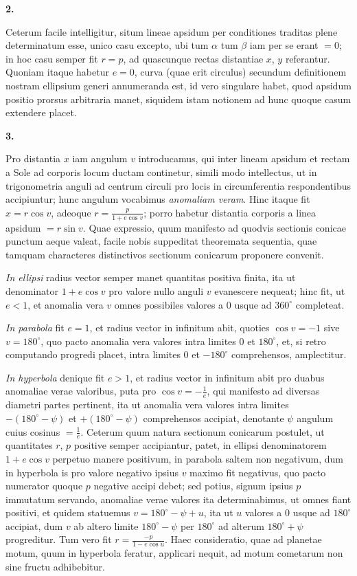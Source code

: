 \documentclass[12pt,a4paper]{book}
\begin{document}
\textbf{2.}

Ceterum facile intelligitur, situm lineae apsidum per conditiones traditas plene determinatum esse, unico casu excepto, ubi tum $\alpha$ tum $\beta$ iam per se erant $=0$; in hoc casu semper fit $r=p$, ad quascunque rectas distantiae $x$, $y$ referantur. Quoniam itaque habetur $e=0$, curva (quae erit circulus) secundum definitionem nostram ellipsium generi annumeranda est, id vero singulare habet, quod apsidum positio prorsus arbitraria manet, siquidem istam notionem ad hunc quoque casum extendere placet.

\textbf{3.}

Pro distantia $x$ iam angulum $v$ introducamus, qui inter lineam apsidum et rectam a Sole ad corporis locum ductam continetur, simili modo intellectus, ut in trigonometria anguli ad centrum circuli pro locis in circumferentia respondentibus accipiuntur; hunc angulum vocabimus \textit{anomaliam veram}. Hinc itaque fit $x=r\cos v$, adeoque $r=\frac{p}{1+e\cos v}$; porro habetur distantia corporis a linea apsidum $=r\sin v$. Quae expressio, quum manifesto ad quodvis sectionis conicae punctum aeque valeat, facile nobis suppeditat theoremata sequentia, quae tamquam characteres distinctivos sectionum conicarum proponere convenit.

\textit{In ellipsi} radius vector semper manet quantitas positiva finita, ita ut denominator $1+e\cos v$ pro valore nullo anguli $v$ evanescere nequeat; hinc fit, ut $e<1$, et anomalia vera $v$ omnes possibiles valores a $0$ usque ad $360^{\circ}$ completeat.

\textit{In parabola} fit $e=1$, et radius vector in infinitum abit, quoties $\cos v=-1$ sive $v=180^{\circ}$, quo pacto anomalia vera valores intra limites $0$ et $180^{\circ}$, et, si retro computando progredi placet, intra limites $0$ et $-180^{\circ}$ comprehensos, amplectitur.

\textit{In hyperbola} denique fit $e>1$, et radius vector in infinitum abit pro duabus anomaliae verae valoribus, puta pro $\cos v=-\frac{1}{e}$, qui manifesto ad diversas diametri partes pertinent, ita ut anomalia vera valores intra limites $-(180^{\circ}-\psi)$ et $+(180^{\circ}-\psi)$ comprehensos accipiat, denotante $\psi$ angulum cuius cosinus $=\frac{1}{e}$. Ceterum quum natura sectionum conicarum postulet, ut quantitates $r$, $p$ positive semper accipiantur, patet, in ellipsi denominatorem $1+e\cos v$ perpetuo manere positivum, in parabola saltem non negativum, dum in hyperbola is pro valore negativo ipsius $v$ maximo fit negativus, quo pacto numerator quoque $p$ negative accipi debet; sed potius, signum ipsius $p$ immutatum servando, anomaliae verae valores ita determinabimus, ut omnes fiant positivi, et quidem statuemus $v=180^{\circ}-\psi+u$, ita ut $u$ valores a $0$ usque ad $180^{\circ}$ accipiat, dum $v$ ab altero limite $180^{\circ}-\psi$ per $180^{\circ}$ ad alterum $180^{\circ}+\psi$ progreditur. Tum vero fit $r=\frac{-p}{1-e\cos u}$. Haec consideratio, quae ad planetae motum, quum in hyperbola feratur, applicari nequit, ad motum cometarum non sine fructu adhibebitur.
\end{document}
